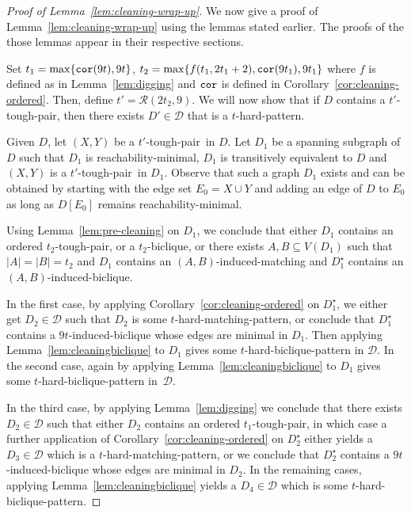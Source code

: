 \documentclass[a4paper,11pt]{article}
\theoremstyle{plain}
\newtheorem{identification rule}{Identification Rule}
\theoremstyle{definition}
\theoremstyle{remark}
\newcommand{\toughpair}{tough-pair}
\newcommand{\hardbiclique}[1]{$#1$-hard-biclique-pattern}
\newcommand{\hardmatching}[1]{$#1$-hard-matching-pattern}
\newcommand{\hardpattern}[1]{$#1$-hard-pattern}
\newcommand{\corr}{\textnormal{\texttt{cor}}}
\newcommand{\cor}[1]{\corr(#1)}
\begin{document}
\begin{proof}[Proof of Lemma~\ref{lem:cleaning-wrap-up}]
We now give a proof of Lemma~\ref{lem:cleaning-wrap-up} using the lemmas stated earlier. The proofs of the those lemmas appear in their respective sections.

Set $t_1 = \max\{\cor{9t},9t\}$, $t_2 =\max \{ f(t_1, 2t_1+2), \cor{9t_1}, 9t_1 \}$ where $f$ is defined as in Lemma~\ref{lem:digging} and $\corr$ is defined in Corollary~\ref{cor:cleaning-ordered}. Then, define $t' =  \mathcal{R}(2t_2,9)$. We will now show that if $D$ contains a $t'$-\toughpair, then there exists $D' \in \mathcal{D}$ that is a \hardpattern{t}.

Given $D$, let $(X,Y)$ be a $t'$-\toughpair\ in $D$. Let $D_1$ be a spanning subgraph of $D$ such that $D_1$ is reachability-minimal, $D_1$ is transitively equivalent to $D$ and $(X,Y)$ is a $t'$-\toughpair\ in $D_1$. Observe that such a graph $D_1$ exists and can be obtained by starting with the edge set $E_0=X \cup Y$ and adding an edge of $D$ to $E_0$ as long as $D[E_0]$ remains reachability-minimal. 

Using Lemma~\ref{lem:pre-cleaning} on $D_1$, we conclude that either $D_1$ contains an ordered $t_2$-\toughpair, or a $t_2$-biclique, or there exists $A,B \subseteq V(D_1)$ such that $|A|=|B|=t_2$ and $D_1$ contains an $(A,B)$-induced-matching and $D_1^{\star}$ contains an $(A,B)$-induced-biclique. 

In the first case, by applying Corollary~\ref{cor:cleaning-ordered} on $D^{\star}_1$, we either get $D_2 \in \mathcal{D}$ such that $D_2$ is some \hardmatching{t}, 
or conclude that $D^{\star}_1$ contains a $9t$-induced-biclique whose edges are minimal in $D_1$. Then applying Lemma~\ref{lem:cleaningbiclique} to $D_1$ gives some \hardbiclique{t} in $\mathcal{D}$.
In the second case, again by applying Lemma~\ref{lem:cleaningbiclique} to $D_1$ gives some \hardbiclique{t} in~$\mathcal{D}$.

In the third case, by applying Lemma~\ref{lem:digging} we conclude that there exists $D_2 \in \mathcal{D}$ such that either $D_2$ contains an ordered $t_1$-\toughpair, in which case a further application of Corollary~\ref{cor:cleaning-ordered} on $D^{\star}_2$ either yields a $D_3 \in \mathcal{D}$ which is a \hardmatching{t}, or we conclude that $D^{\star}_2$ contains a $9t$-induced-biclique whose edges are minimal in $D_2$. In the remaining cases, applying Lemma~\ref{lem:cleaningbiclique} yields a $D_4 \in \mathcal{D}$ which is some \hardbiclique{t}.
\end{proof}
\end{document}
